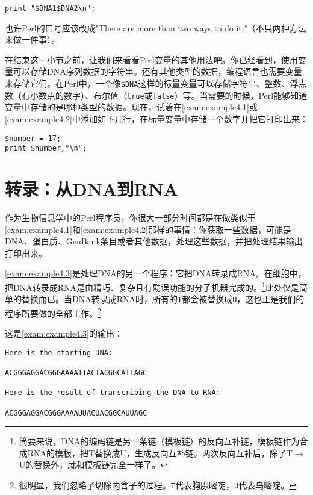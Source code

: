 \begin{lstlisting}
print "$DNA1$DNA2\n";
\end{lstlisting}

也许Perl的口号应该改成"There are more than two ways to do it."（不只两种方法来做一件事）。

在结束这一小节之前，让我们来看看Perl变量的其他用法吧。你已经看到，使用变量可以存储DNA序列数据的字符串。还有其他类型的数据，编程语言也需要变量来存储它们。在Perl中，一个像\verb|$DNA|这样的标量变量可以存储字符串、整数、浮点数（有小数点的数字）、布尔值（\verb|true|或\verb|false|）等。当需要的时候，Perl能够知道变量中存储的是哪种类型的数据。现在，试着在\autoref{exam:example4.1}或\autoref{exam:example4.2}中添加如下几行，在标量变量中存储一个数字并把它打印出来：

\begin{lstlisting}
$number = 17;
print $number,"\n";
\end{lstlisting}

\section{转录：从DNA到RNA}
作为生物信息学中的Perl程序员，你很大一部分时间都是在做类似于\autoref{exam:example4.1}和\autoref{exam:example4.2}那样的事情：你获取一些数据，可能是DNA、蛋白质、GenBank条目或者其他数据，处理这些数据，并把处理结果输出打印出来。

\autoref{exam:example4.3}是处理DNA的另一个程序：它把DNA转录成RNA。在细胞中，把DNA转录成RNA是由精巧、复杂且有勘误功能的分子机器完成的。\footnote{简要来说，DNA的编码链是另一条链（模板链）的反向互补链，模板链作为合成RNA的模板，把T替换成U，生成反向互补链。两次反向互补后，除了T$\rightarrow$U的替换外，就和模板链完全一样了。}此处仅是简单的替换而已。当DNA转录成RNA时，所有的\verb|T|都会被替换成\verb|U|，这也正是我们的程序所要做的全部工作。\footnote{很明显，我们忽略了切除内含子的过程。\verb|T|代表胸腺嘧啶，\verb|U|代表鸟嘧啶。}



这是\autoref{exam:example4.3}的输出：

\begin{lstlisting}
Here is the starting DNA:

ACGGGAGGACGGGAAAATTACTACGGCATTAGC

Here is the result of transcribing the DNA to RNA:

ACGGGAGGACGGGAAAAUUACUACGGCAUUAGC
\end{lstlisting}

